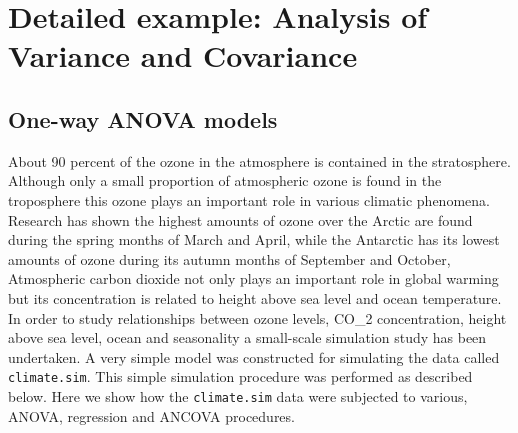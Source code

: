 \documentclass[
]{book}
\begin{document}
\section{Detailed example: Analysis of Variance and Covariance}\label{detailed-example-analysis-of-variance-and-covariance}

\subsection{One-way ANOVA models}\label{AnovaOneWay}

About 90 percent of the ozone in the atmosphere is contained in the stratosphere. Although only a small proportion of atmospheric ozone is found in the troposphere this ozone plays an important role in various climatic phenomena. Research has shown the highest amounts of ozone over the Arctic are found during the spring months of March and April, while the Antarctic has its lowest amounts of ozone during its autumn months of September and October, Atmospheric carbon dioxide not only plays an important role in global warming but its concentration is related to height above sea level and ocean temperature. In order to study relationships between ozone levels, CO\_2 concentration, height above sea level, ocean and seasonality a small-scale simulation study has been undertaken. A very simple model was constructed for simulating the data called \texttt{climate.sim}. This simple simulation procedure was performed as described below. Here we show how the \texttt{climate.sim} data were subjected to various, ANOVA, regression and ANCOVA procedures.
\end{document}
